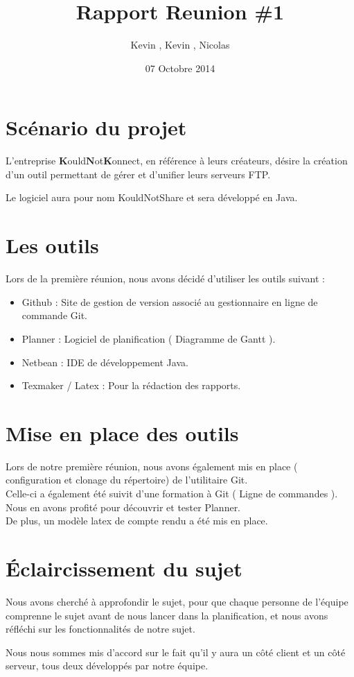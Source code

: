 \documentclass{article}
\title{Rapport Reunion \#1}
\author{Kevin \bsc{Bascol}, Kevin \bsc{Laoussing}, Nicolas \bsc{Reynaud}}
\date{07 Octobre 2014}
\begin{document}
\maketitle
\newpage

\renewcommand{\contentsname}{Sommaire}
\tableofcontents
\newpage


\section{Scénario du projet}

L'entreprise $\textbf{K}$ould$\textbf{N}$ot$\textbf{K}$onnect, en référence à leurs créateurs, désire la création d'un outil permettant de gérer et d'unifier leurs serveurs FTP.

Le logiciel aura pour nom KouldNotShare et sera développé en Java.

\section{Les outils}

Lors de la première réunion, nous avons décidé d'utiliser les outils suivant : 
\begin{itemize}
	\item Github : Site de gestion de version associé au gestionnaire en ligne de commande Git.
	\item Planner : Logiciel de planification ( Diagramme de Gantt ).
	\item Netbean : IDE de développement Java.
	\item Texmaker / Latex : Pour la rédaction des rapports.
\end{itemize}

\section{Mise en place des outils}

Lors de notre première réunion, nous avons également mis en place ( configuration et clonage du répertoire) de l'utilitaire Git. \\
Celle-ci a également été suivit d'une formation à Git ( Ligne de commandes ). \\

Nous en avons profité pour découvrir et tester Planner. \\
De plus, un modèle latex de compte rendu a été mis en place. \\

\section{Éclaircissement du sujet}

Nous avons cherché à approfondir le sujet, pour que chaque personne de l'équipe comprenne le sujet avant de nous lancer dans la planification, et nous avons réfléchi sur les fonctionnalités de notre sujet.\linebreak

Nous nous sommes mis d'accord sur le fait qu'il y aura un côté client et un côté serveur, tous deux développés par notre équipe.
\end{document}

